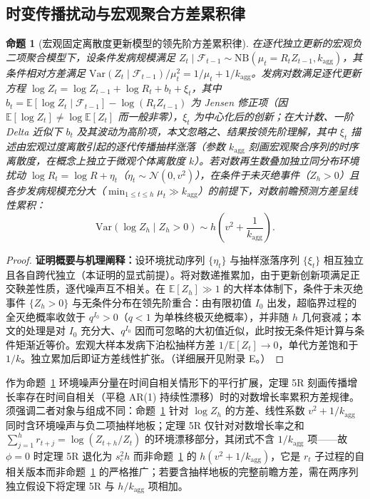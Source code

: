 \documentclass[11pt,a4paper]{article}
\theoremstyle{plain}
\newtheorem{proposition}{命题}
\theoremstyle{definition}
\begin{document}


\subsection{时变传播扰动与宏观聚合方差累积律}

\begin{proposition}[宏观固定离散度更新模型的领先阶方差累积律]\label{thm:t5}
在逐代独立更新的宏观负二项聚合模型下，设条件发病规模满足 $Z_t \mid \mathcal{F}_{t-1} \sim \text{NB}(\mu_t = R_t Z_{t-1}, k_{\text{agg}})$，其条件相对方差满足 $\text{Var}(Z_t \mid \mathcal{F}_{t-1})/\mu_t^2 = 1/\mu_t + 1/k_{\text{agg}}$。发病对数满足逐代更新方程 $\log Z_t = \log Z_{t-1} + \log R_t + b_t + \xi_t$，其中 $b_t = \mathbb{E}[\log Z_t \mid \mathcal{F}_{t-1}] - \log(R_t Z_{t-1})$ 为 Jensen 修正项（因 $\mathbb{E}[\log Z_t] \neq \log \mathbb{E}[Z_t]$ 而一般非零），$\xi_t$ 为中心化后的创新；在大计数、一阶 Delta 近似下 $b_t$ 及其波动为高阶项，本文忽略之、结果按领先阶理解，其中 $\xi_t$ 描述由宏观过度离散引起的逐代传播抽样涨落（参数 $k_{\text{agg}}$ 刻画宏观聚合序列的时序离散度，在概念上独立于微观个体离散度 $k$）。若对数再生数叠加独立同分布环境扰动 $\log R_t = \log R + \eta_t$（$\eta_t \sim \mathcal{N}(0, v^2)$），在条件于未灭绝事件（$Z_h > 0$）且各步发病规模充分大（$\min_{1 \le t \le h} \mu_t \gg k_{\text{agg}}$）的前提下，对数前瞻预测方差呈线性累积：
\begin{equation}
\text{Var}(\log Z_h \mid Z_h > 0) \sim h \left(v^2 + \frac{1}{k_{\text{agg}}}\right).
\end{equation}
\end{proposition}

\begin{proof}
\textbf{证明概要与机理阐释：}设环境扰动序列 $\{\eta_t\}$ 与抽样涨落序列 $\{\xi_t\}$ 相互独立且各自跨代独立（本证明的显式前提）。将对数递推累加，由于更新创新项满足正交鞅差性质，逐代噪声互不相关。在 $\mathbb{E}[Z_h]\gg 1$ 的大样本体制下，条件于未灭绝事件 $\{Z_h>0\}$ 与无条件分布在领先阶重合：由有限初值 $I_0$ 出发，超临界过程的全灭绝概率收敛于 $q^{I_0}>0$（$q<1$ 为单株终极灭绝概率），并非随 $h$ 几何衰减；本文的处理是对 $I_0$ 充分大、$q^{I_0}$ 因而可忽略的大初值近似，此时按无条件矩计算与条件矩渐近等价。宏观大样本发病下泊松抽样方差 $1/\mathbb{E}[Z_t] \to 0$，单代方差饱和于 $1/k$。独立累加后即证方差线性扩张。（详细展开见附录 E。）
\end{proof}

作为命题~\ref{thm:t5} 环境噪声分量在时间自相关情形下的平行扩展，定理 5R 刻画传播增长率存在时间自相关（平稳 AR(1) 持续性漂移）时的对数增长率累积方差规律。须强调二者对象与组成不同：命题~\ref{thm:t5} 针对 $\log Z_h$ 的方差、线性系数 $v^2 + 1/k_{\text{agg}}$ 同时含环境噪声与负二项抽样地板；定理 5R 仅针对对数增长率之和 $\sum_{j=1}^h r_{t+j} = \log(Z_{t+h}/Z_t)$ 的环境漂移部分，其闭式不含 $1/k_{\text{agg}}$ 项——故 $\phi=0$ 时定理 5R 退化为 $s_e^2 h$ 而非命题~\ref{thm:t5} 的 $h(v^2+1/k_{\text{agg}})$，它是 $r_t$ 子过程的自相关版本而非命题~\ref{thm:t5} 的严格推广；若要含抽样地板的完整前瞻方差，需在两序列独立假设下将定理 5R 与 $h/k_{\text{agg}}$ 项相加。
\end{document}
